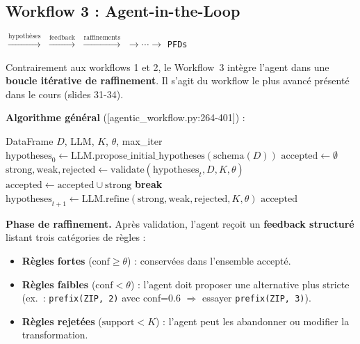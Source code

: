 \documentclass[12pt,a4paper]{article}
\begin{document}
\subsection{Workflow 3 : Agent-in-the-Loop}
\label{subsec:w3}

\begin{tcolorbox}[colback=red!5!white, colframe=red!50!black, title=Workflow 3 -- Agent-in-the-Loop Discovery]
\begin{center}
 $\xrightarrow{\text{hypoth\`{e}ses}}$  $\xrightarrow{\text{feedback}}$  $\xrightarrow{\text{raffinements}}$  $\rightarrow \cdots \rightarrow$ \texttt{PFDs}
\end{center}
\end{tcolorbox}

Contrairement aux workflows 1 et 2, le Workflow~3 int\`{e}gre l'agent dans une \textbf{boucle it\'{e}rative de raffinement}. Il s'agit du workflow le plus avanc\'{e} pr\'{e}sent\'{e} dans le cours (slides 31-34).

\textbf{Algorithme g\'{e}n\'{e}ral} ([agentic\_workflow.py:264-401]) :

\begin{algorithm}[H]
\caption{Workflow 3 -- Agent-in-the-Loop}
\label{algo:w3}
\begin{algorithmic}[1]
\REQUIRE DataFrame $D$, LLM, $K$, $\theta$, max\_iter
\STATE $\text{hypotheses}_0 \leftarrow \text{LLM.propose\_initial\_hypotheses}(\text{schema}(D))$
\STATE $\text{accepted} \leftarrow \emptyset$
    \STATE $\text{strong}, \text{weak}, \text{rejected} \leftarrow \text{validate}(\text{hypotheses}_t, D, K, \theta)$
    \STATE $\text{accepted} \leftarrow \text{accepted} \cup \text{strong}$
        \STATE \textbf{break} 
    \ENDIF
    \STATE $\text{hypotheses}_{t+1} \leftarrow \text{LLM.refine}(\text{strong}, \text{weak}, \text{rejected}, K, \theta)$
\ENDFOR
\RETURN $\text{accepted}$
\end{algorithmic}
\end{algorithm}

\textbf{Phase de raffinement.} Apr\`{e}s validation, l'agent re\c{c}oit un \textbf{feedback structur\'{e}} listant trois cat\'{e}gories de r\`{e}gles :
\begin{itemize}
    \item \textbf{R\`{e}gles fortes} ($\text{conf} \geq \theta$) : conserv\'{e}es dans l'ensemble accept\'{e}.
    \item \textbf{R\`{e}gles faibles} ($\text{conf} < \theta$) : l'agent doit proposer une alternative plus stricte (ex.\ : \texttt{prefix(ZIP, 2)} avec conf=0.6 $\Rightarrow$ essayer \texttt{prefix(ZIP, 3)}).
    \item \textbf{R\`{e}gles rejet\'{e}es} ($\text{support} < K$) : l'agent peut les abandonner ou modifier la transformation.
\end{itemize}
\end{document}
